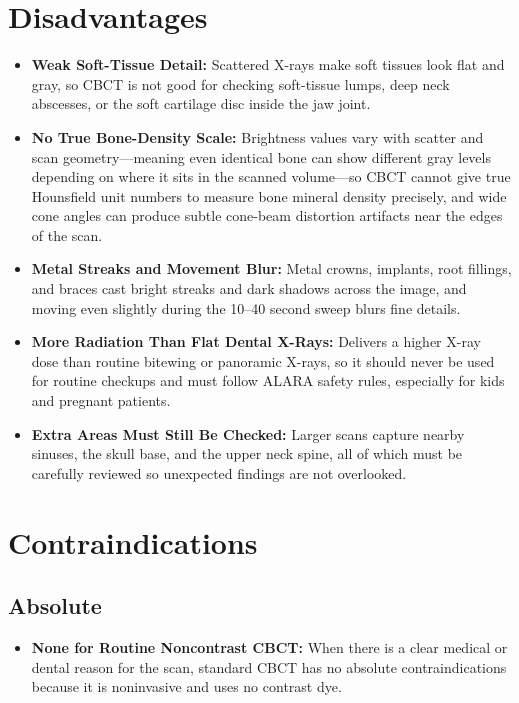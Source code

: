 \section{Disadvantages}
\begin{itemize}
    \item \textbf{Weak Soft-Tissue Detail:} Scattered X-rays make soft tissues look flat and gray, so CBCT is not good for checking soft-tissue lumps, deep neck abscesses, or the soft cartilage disc inside the jaw joint.
    \item \textbf{No True Bone-Density Scale:} Brightness values vary with scatter and scan geometry---meaning even identical bone can show different gray levels depending on where it sits in the scanned volume---so CBCT cannot give true Hounsfield unit numbers to measure bone mineral density precisely, and wide cone angles can produce subtle cone-beam distortion artifacts near the edges of the scan.
    \item \textbf{Metal Streaks and Movement Blur:} Metal crowns, implants, root fillings, and braces cast bright streaks and dark shadows across the image, and moving even slightly during the 10--40 second sweep blurs fine details.
    \item \textbf{More Radiation Than Flat Dental X-Rays:} Delivers a higher X-ray dose than routine bitewing or panoramic X-rays, so it should never be used for routine checkups and must follow ALARA safety rules, especially for kids and pregnant patients.
    \item \textbf{Extra Areas Must Still Be Checked:} Larger scans capture nearby sinuses, the skull base, and the upper neck spine, all of which must be carefully reviewed so unexpected findings are not overlooked.
\end{itemize}

\section{Contraindications}

\subsection{Absolute}
\begin{itemize}
    \item \textbf{None for Routine Noncontrast CBCT:} When there is a clear medical or dental reason for the scan, standard CBCT has no absolute contraindications because it is noninvasive and uses no contrast dye.
\end{itemize}

